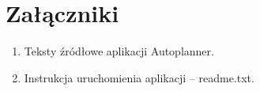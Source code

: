 \chapter{Załączniki}
\begin{enumerate}
\item Teksty źródłowe aplikacji Autoplanner.
\item Instrukcja uruchomienia aplikacji -- readme.txt.
\end{enumerate}
